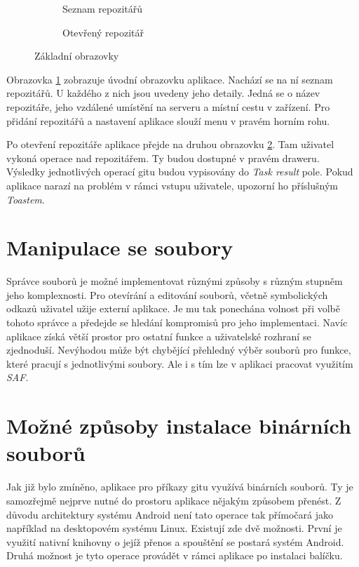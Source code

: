 \begin{figure}[ht]
    \centering
    \begin{subfigure}{.4\textwidth}
        \centering
        \caption{Seznam repozitářů}\label{fig:orig}
        \label{fig:repolist_frame}
    \end{subfigure}
    \begin{subfigure}{.4\textwidth}
        \centering
        \caption{Otevřený repozitář}
        \label{fig:result_frame}
    \end{subfigure}
\caption{Základní obrazovky}%
\label{fig:obrazovky}%
\end{figure}

Obrazovka \ref{fig:repolist_frame} zobrazuje úvodní obrazovku aplikace. Nachází se na ní seznam repozitářů. U každého z nich jsou uvedeny jeho detaily. Jedná se o název repozitáře, jeho vzdálené umístění na serveru a místní cestu v zařízení. Pro přidání repozitářů a nastavení aplikace slouží menu v pravém horním rohu. 

Po otevření repozitáře aplikace přejde na druhou obrazovku \ref{fig:result_frame}. Tam uživatel vykoná operace nad repozitářem. Ty budou dostupné v pravém draweru. Výsledky jednotlivých operací gitu budou vypisovány do \emph{Task result} pole. Pokud aplikace narazí na problém v rámci vstupu uživatele, upozorní ho příslušným \emph{Toastem}.

\section{Manipulace se soubory}
Správce souborů je možné implementovat různými způsoby s různým stupněm jeho komplexnosti. Pro otevírání a editování souborů, včetně symbolických odkazů uživatel užije externí aplikace. Je mu tak ponechána volnost při volbě tohoto správce a předejde se hledání kompromisů pro jeho implementaci. Navíc aplikace  získá větší prostor pro ostatní funkce a uživatelské rozhraní se zjednoduší. Nevýhodou může být chybějící přehledný výběr souborů pro funkce, které pracují s jednotlivými soubory. Ale i s tím lze v aplikaci pracovat využitím \emph{SAF}.

\section{Možné způsoby instalace binárních souborů}
Jak již bylo zmíněno, aplikace pro příkazy gitu využívá binárních souborů. Ty je samozřejmě nejprve nutné do prostoru aplikace nějakým způsobem přenést. Z důvodu architektury systému Android není tato operace tak přímočará jako například na desktopovém systému Linux. Existují zde dvě možnosti. První je využití nativní knihovny o jejíž přenos a spouštění se postará systém Android. Druhá možnost je tyto operace provádět v rámci aplikace po instalaci balíčku.

